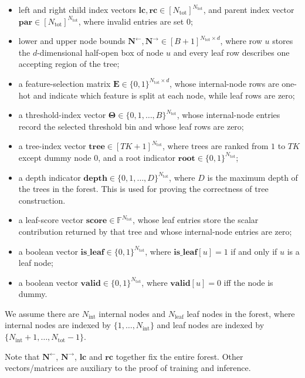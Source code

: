 \begin{itemize}
  \item left and right child index vectors
  $\mathbf{lc},\mathbf{rc}\in[N_{\mathrm{tot}}]^{N_{\mathrm{tot}}}$,
  and parent index vector $\mathbf{par}\in[N_{\mathrm{tot}}]^{N_{\mathrm{tot}}}$, where invalid entries are set $0$;
  \item lower and upper node bounds
  $\mathbf{N}^{\leftarrow},\mathbf{N}^{\rightarrow}\in[B+1]^{N_{\mathrm{tot}}\times d}$,
  where row $u$ stores the $d$-dimensional half-open box of node $u$ and every
  leaf row describes one accepting region of the tree;
  \item a feature-selection matrix
  $\mathbf{E}\in\{0,1\}^{N_{\mathrm{tot}}\times d}$,
  whose internal-node rows are one-hot and indicate which feature is split at
  each node, while leaf rows are zero;
  \item a threshold-index vector
  $\boldsymbol{\Theta}\in\{0,1,\ldots,B\}^{N_{\mathrm{tot}}}$,
  whose internal-node entries record the selected threshold bin and whose leaf rows are zero;
  \item a tree-index vector $\mathbf{tree}\in[TK+1]^{N_{\mathrm{tot}}}$, where trees are ranked from $1$ to $TK$
  except dummy node $0$, and a
  root indicator $\mathbf{root}\in\{0,1\}^{N_{\mathrm{tot}}}$;
  \item a depth indicator $\mathbf{depth}\in\{0,1,\ldots,D\}^{N_{\mathrm{tot}}}$, where $D$ is the maximum depth of the trees in the forest. This is used for proving the correctness of tree construction.
  \item a leaf-score vector $\mathbf{score}\in\mathbb{F}^{N_{\mathrm{tot}}}$,
  whose leaf entries store the scalar contribution returned by that tree and
  whose internal-node entries are zero;
  \item a boolean vector $\mathbf{is\_leaf}\in\{0,1\}^{N_{\mathrm{tot}}}$, 
  where $\mathbf{is\_leaf}[u]=1$ if and only if $u$ is a leaf node;
  \item a boolean vector $\mathbf{valid}\in \{0, 1\}^{N_{\mathrm{tot}}}$, where $\mathbf{valid}[u]=0$ iff the node is dummy.
\end{itemize}

We assume there are $N_{\mathrm{int}}$ internal nodes and $N_{\mathrm{leaf}}$ leaf nodes
in the forest, where internal nodes are indexed by $\{1,\ldots,N_{\mathrm{int}}\}$ and leaf nodes are indexed by
$\{N_{\mathrm{int}}+1, \dots, N_{\mathrm{tot}}-1\}$.

Note that $\mathbf{N}^{\leftarrow}$, $\mathbf{N}^{\rightarrow}$, $\mathbf{lc}$
and $\mathbf{rc}$ together fix the entire forest.
Other vectors/matrices are auxiliary to the proof
of training and inference.


